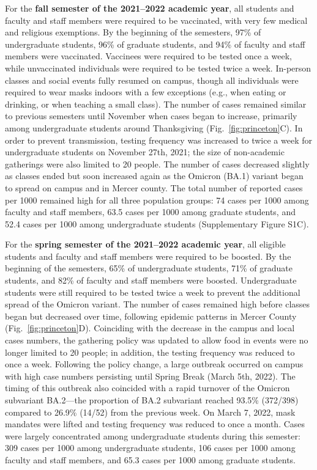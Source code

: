 \documentclass[12pt]{article}
\newcommand{\fref}[1]{Fig.~\ref{fig:#1}}
\begin{document}
For the \textbf{fall semester of the 2021--2022 academic year}, all students and faculty and staff members were required to be vaccinated, with very few medical and religious exemptions.
By the beginning of the semesters, 97\% of undergraduate students, 96\% of graduate students, and 94\% of faculty and staff members were vaccinated.
Vaccinees were required to be tested once a week, while unvaccinated individuals were required to be tested twice a week.
In-person classes and social events fully resumed on campus, though all individuals were required to wear masks indoors with a few exceptions (e.g., when eating or drinking, or when teaching a small class).
The number of cases remained similar to previous semesters until November when cases began to increase, primarily among undergraduate students around Thanksgiving (\fref{princeton}C).  
In order to prevent transmission, testing frequency was increased to twice a week for undergraduate students on November 27th, 2021; the size of non-academic gatherings were also limited to 20 people.
The number of cases decreased slightly as classes ended but soon increased again as the Omicron (BA.1) variant began to spread on campus and in Mercer county.
The total number of reported cases per 1000 remained high for all three population groups: 74 cases per 1000 among faculty and staff members, 63.5 cases per 1000 among graduate students, and 52.4 cases per 1000 among undergraduate students (Supplementary Figure S1C).

For the \textbf{spring semester of the 2021--2022 academic year}, all eligible students and faculty and staff members were required to be boosted.
By the beginning of the semesters, 65\% of undergraduate students, 71\% of graduate students, and 82\% of faculty and staff members were boosted.
Undergraduate students were still required to be tested twice a week to prevent the additional spread of the Omicron variant.
The number of cases remained high before classes began but decreased over time, following epidemic patterns in Mercer County (\fref{princeton}D).
Coinciding with the decrease in the campus and local cases numbers, the gathering policy was updated to allow food in events were no longer limited to 20 people;
in addition, the testing frequency was reduced to once a week.
Following the policy change, a large outbreak occurred on campus with high case numbers persisting until Spring Break (March 5th, 2022).
The timing of this outbreak also coincided with a rapid turnover of the Omicron subvariant BA.2---the proportion of BA.2 subvariant reached 93.5\% (372/398) compared to 26.9\% (14/52) from the previous week.
On March 7, 2022, mask mandates were lifted and testing frequency was reduced to once a month.
Cases were largely concentrated among undergraduate students during this semester: 309 cases per 1000 among undergraduate students, 106 cases per 1000 among faculty and staff members, and 65.3 cases per 1000 among graduate students.
\end{document}
